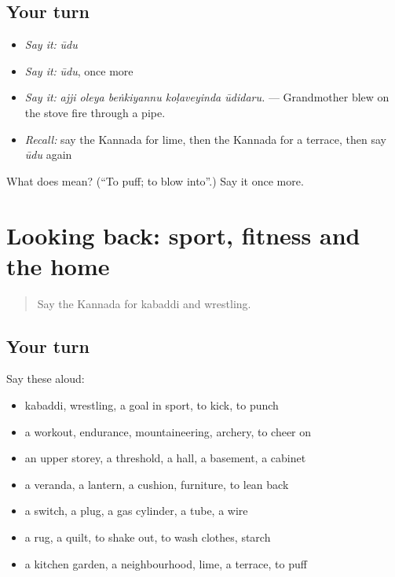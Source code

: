 \subsection*{Your turn}
\begin{itemize}
\raggedright
  \item \emph{Say it:} \emph{ūdu}
  \item \emph{Say it:} \emph{ūdu}, once more
  \item \emph{Say it:} \emph{ajji oleya beṅkiyannu koḷaveyinda ūdidaru.} — Grandmother blew on the stove fire through a pipe.
  \item \emph{Recall:} say the Kannada for lime, then the Kannada for a terrace, then say \emph{ūdu} again
\end{itemize}

\begin{tcolorbox}[breakable,colback=teal!4,colframe=teal!35!black,title={Before you move on}]
What does  mean? (\textquotedblleft{}To puff; to blow into\textquotedblright{}.) Say it once more.
\end{tcolorbox}
\section[(dialogue)]{Looking back: sport, fitness and the home}

\label{lesson:KA-R546-review-540-546}



\begin{quote}
Say the Kannada for kabaddi and wrestling.
\end{quote}

\subsection*{Your turn}
Say these aloud:

\begin{itemize}
\raggedright
  \item kabaddi, wrestling, a goal in sport, to kick, to punch
  \item a workout, endurance, mountaineering, archery, to cheer on
  \item an upper storey, a threshold, a hall, a basement, a cabinet
  \item a veranda, a lantern, a cushion, furniture, to lean back
  \item a switch, a plug, a gas cylinder, a tube, a wire
  \item a rug, a quilt, to shake out, to wash clothes, starch
  \item a kitchen garden, a neighbourhood, lime, a terrace, to puff
\end{itemize}

